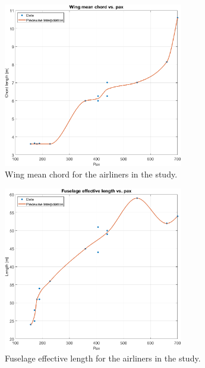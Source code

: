\documentclass[english]{kththesis}
\begin{document}
\begin{figure}[!ht]
    \centering
    \includegraphics[width=0.7\textwidth]{Epictures/WingChordVSPax.png}
    \caption{Wing mean chord for the airliners in the study.}
    \label{fig:WingChordPax}
\end{figure}

\begin{figure}[!ht]
    \centering
    \includegraphics[width=0.7\textwidth]{Epictures/FuselageLengthVSPax.png}
    \caption{Fuselage effective length for the airliners in the study.}
    \label{fig:FuselageLePax}
\end{figure}
\end{document}
